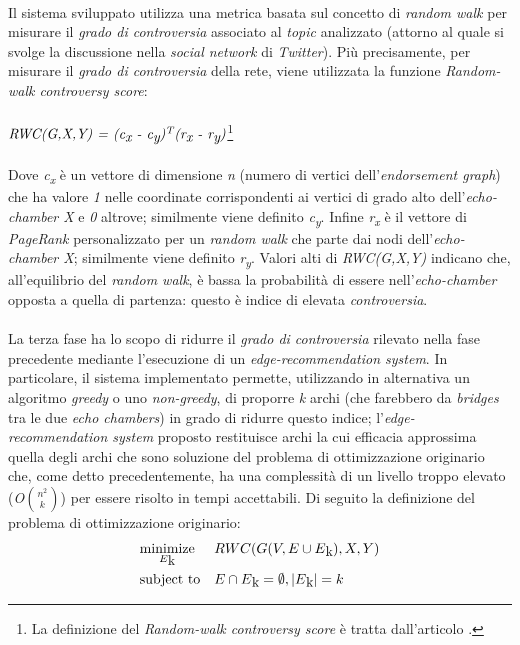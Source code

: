 \\Il sistema sviluppato utilizza una metrica basata sul concetto di \textit{random walk} per misurare il \textit{grado di controversia} associato al \textit{topic} analizzato (attorno al quale si svolge la discussione nella \textit{social network} di \textit{Twitter}). Più precisamente, per misurare il \textit{grado di controversia} della rete, viene utilizzata la funzione \textit{Random-walk controversy score}:
\\\\
$\textit{RWC(G,X,Y) = (c\textsubscript{x} - c\textsubscript{y})\textsuperscript{T}(r\textsubscript{x} - r\textsubscript{y})}$\footnote{La definizione del \textit{Random-walk controversy score} è tratta dall'articolo \cite{garimella:paper}.}
\\\\Dove \textit{c\textsubscript{x}} è un vettore di dimensione \textit{n} (numero di vertici dell'\textit{endorsement graph}) che ha valore \textit{1} nelle coordinate corrispondenti ai vertici di grado alto dell'\textit{echo-chamber X} e \textit{0} altrove; similmente viene definito \textit{c\textsubscript{y}}. Infine \textit{r\textsubscript{x}} è il vettore di \textit{PageRank} personalizzato per un \textit{random walk} che parte dai nodi dell'\textit{echo-chamber X}; similmente viene definito \textit{r\textsubscript{y}}. Valori alti di \textit{RWC(G,X,Y)} indicano che, all'equilibrio del \textit{random walk}, è bassa la probabilità di essere nell'\textit{echo-chamber} opposta a quella di partenza: questo è indice di elevata \textit{controversia}. 
\\\\La terza fase ha lo scopo di ridurre il \textit{grado di controversia} rilevato nella fase precedente mediante l'esecuzione di un \textit{edge-recommendation system}. In particolare, il sistema implementato permette, utilizzando in alternativa un algoritmo \textit{greedy} o uno \textit{non-greedy}, di proporre \textit{k} archi (che farebbero da \textit{bridges} tra le due \textit{echo chambers}) in grado di ridurre questo indice; l'\textit{edge-recommendation system} proposto restituisce archi la cui efficacia approssima quella degli archi che sono soluzione del problema di ottimizzazione originario che, come detto precedentemente, ha una complessità di un livello troppo elevato (\textit{O}${n^2\choose k}$) per essere risolto in tempi accettabili. Di seguito la definizione del problema di ottimizzazione originario:
\\
\begin{equation*}
\begin{aligned}
& \underset{E\textsubscript{k}}{\text{minimize}}
& & RWC(G(V, E \cup E\textsubscript{k}),X,Y) \\
& \text{subject to}
& & E \cap E\textsubscript{k} = \emptyset, \left|{E\textsubscript{k}}\right| = k
\end{aligned}
\end{equation*}

